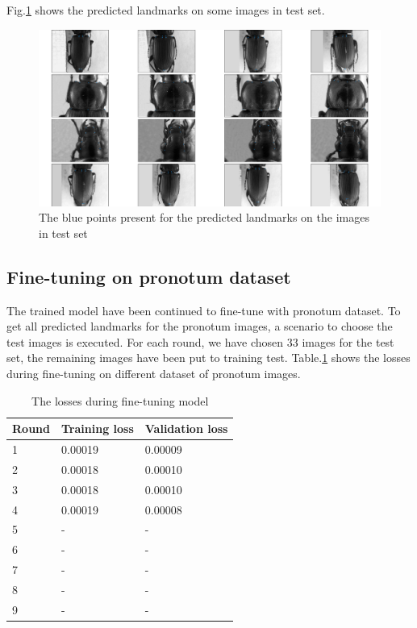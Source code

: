 \documentclass[12pt,a4paper]{article}
\begin{document}
Fig.\ref{figtestallparts} shows the predicted landmarks on some images in test set.
\begin{figure}[h!]
	\centering
	\includegraphics[scale=0.53]{images/all_parts_10000epochs_test}
	\caption{The blue points present for the predicted landmarks on the images in test set}
	\label{figtestallparts}
\end{figure}
\subsection{Fine-tuning on pronotum dataset}
The trained model have been continued to fine-tune \cite{yosinski2014transferable} with pronotum dataset. To get all predicted landmarks for the pronotum images, a scenario to choose the test images is executed. For each round, we have chosen 33 images for the test set, the remaining images have been put to training test. Table.\ref{finetuningloss} shows the losses during fine-tuning on different dataset of pronotum images.

\begin{table}[h!]
	\centering
	\begin{tabular}{l l l}
	Round & Training loss & Validation loss \\ \hline
	1 & 0.00019 & 0.00009  \\ \hline
	2 & 0.00018 & 0.00010 \\ \hline
	3 & 0.00018 & 0.00010 \\ \hline
	4 & 0.00019 & 0.00008 \\ \hline
	5 & - & - \\ \hline
	6 & - & - \\ \hline
	7 & - & - \\ \hline
	8 & - & - \\ \hline
	9 & - & - \\ \hline
	\end{tabular}
	\caption{The losses during fine-tuning model}
	\label{finetuningloss}
\end{table}
\end{document}
